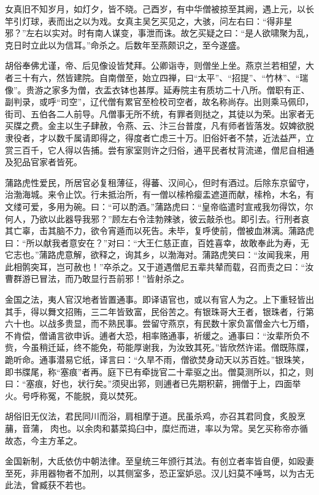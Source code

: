 \documentclass[]{article}
\begin{document}
女真旧不知岁月，如灯夕，皆不晓。己酉岁，有中华僧被掠至其阙，遇上元，以长竿引灯球，表而出之以为戏。女真主吴乞买见之，大骇，问左右曰：``得非星邪？''左右以实对。时有南人谋变，事泄而诛。故乞买疑之曰：``是人欲啸聚为乱，克日时立此以为信耳。''命杀之。后数年至燕颇识之，至今遂盛。

胡俗奉佛尤谨，帝、后见像设皆梵拜。公卿诣寺，则僧坐上坐。燕京兰若相望，大者三十有六，然皆建院。自南僧至，始立四禅，曰``太平''、``招提''、``竹林''、``瑞像''。贵游之家多为僧，衣盂衣钵也甚厚。延寿院主有质坊二十八所。僧职有正、副判录，或呼``司空''，辽代僧有累官至检校司空者，故名称尚存。出则乘马佩印，街司、五伯各二人前导。凡僧事无所不统，有罪者则挞之，其徒以为荣。出家者无买牒之费。金主以生子肆赦，令燕、云、汴三台普度，凡有师者皆落发。奴婢欲脱隶役者，才以数千属请即得之，得度者亡虑三十万。旧俗奸者不禁，近法益严，立赏三百千，它人得以告捕。尝有家室则许之归俗，通平民者杖背流递，僧尼自相通及犯品官家者皆死。

蒲路虎性爱民，所居官必复租薄征，得蕃、汉间心，但时有酒过。后除东京留守，治渤海城。来令止饮。行未抵治所，有一僧以㮦柃瘿盂遮道而献，㮦柃，木名，有文缕可爱，多用为碗。曰：``可以酌酒。''蒲路虎曰：``皇帝临遣时宣戒我勿得饮，尔何人，乃欲以此器导我邪？''顾左右令洼勃辣骇，彼云敲杀也。即引去。行刑者哀其亡辜，击其脑不力，欲令宵遁而以死告。未毕，复呼使前，僧被血淋漓。蒲路虎曰：``所以献我者意安在？''对曰：``大王仁慈正直，百姓喜幸，故敢奉此为寿，无它志也。''蒲路虎意解，欲释之，询其乡，以渤海对。蒲路虎笑曰：``汝闻我来，用此相鹘突耳，岂可赦也！''卒杀之。又于道遇僧尼五辈共辇而载，召而责之曰：``汝曹群游已冒法，而乃敢显行吾前邪！''皆射杀之。

金国之法，夷人官汉地者皆置通事。即译语官也，或以有官人为之。上下重轻皆出其手，得以舞文招贿，三二年皆致富，民俗苦之。有银珠哥大王者，银珠者，行第六十也。以战多贵显，而不熟民事。尝留守燕京，有民数十家负富僧金六七万缗，不肯偿，僧诵言欲申诉。逋者大恐，相率赂通事，祈缓之。通事曰：``汝辈所负不赀，今虽稍迁延，终不能免，苟能厚谢我，为汝致其死。''皆欣然许诺。僧既陈牒，跪听命。通事潜易它纸，译言曰：``久旱不雨，僧欲焚身动天以苏百姓。''银珠笑，即书牒尾，称``塞痕''者再。庭下已有牵拢官二十辈驱之出。僧莫测所以，扣之，则曰：``塞痕，好也，状行矣。''须臾出郛，则逋者已先期积薪，拥僧于上，四面举火。号呼称冤，不能脱，竟以焚死。

胡俗旧无仪法，君民同川而浴，肩相摩于道。民虽杀鸡，亦召其君同食，炙股烹䔕，音蒲，肉也。以余肉和藄菜捣臼中，糜烂而进，率以为常。吴乞买称帝亦循故态，今主方革之。

金国新制，大氐依仿中朝法律。至皇统三年颁行其法。有创立者率皆自便，如殴妻至死，非用器物者不加刑，以其侧室多，恐正室妒忌。汉儿妇莫不唾骂，以为古无此法，曾臧获不若也。
\end{document}
